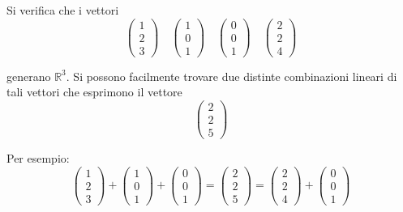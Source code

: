 \begin{example}
	Si verifica che i vettori
	\begin{equation*}
		\begin{pmatrix}
			1 \\ 2 \\ 3
		\end{pmatrix} \quad
		\begin{pmatrix}
			1 \\ 0 \\ 1
		\end{pmatrix} \quad
		\begin{pmatrix}
			0 \\ 0 \\ 1
		\end{pmatrix} \quad
		\begin{pmatrix}
			2 \\ 2 \\ 4
		\end{pmatrix}
	\end{equation*}

	generano $\mathbb{R}^3$. Si possono facilmente trovare due distinte
	combinazioni lineari di tali vettori che esprimono il vettore
	\begin{equation*}
		\begin{pmatrix}
			2 \\ 2 \\ 5
		\end{pmatrix}
	\end{equation*}

	Per esempio:
	\begin{equation*}
		\begin{pmatrix}
			1 \\ 2 \\ 3
		\end{pmatrix} +
		\begin{pmatrix}
			1 \\ 0 \\ 1
		\end{pmatrix} +
		\begin{pmatrix}
			0 \\ 0 \\ 1
		\end{pmatrix} =
		\begin{pmatrix}
			2 \\ 2 \\ 5
		\end{pmatrix} =
		\begin{pmatrix}
			2 \\ 2 \\ 4
		\end{pmatrix} +
		\begin{pmatrix}
			0 \\ 0 \\ 1
		\end{pmatrix}
	\end{equation*}
\end{example}

